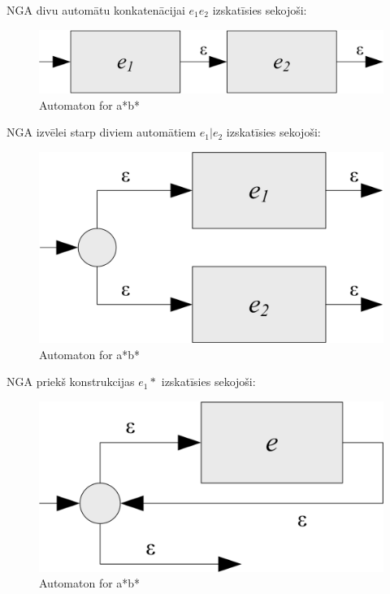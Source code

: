 NGA divu automātu konkatenācijai $e_1 e_2$  izskatīsies sekojoši:
\begin{figure}[h]
  \centering
    \includegraphics[scale=1.5]{pictures/auto_sequence_1}
  \caption{Automaton for a*b*}
  \label{fig:automaton_aastbast}
\end{figure}

NGA izvēlei starp diviem automātiem $e_1 | e_2$ izskatīsies sekojoši:
\begin{figure}[h]
  \centering
    \includegraphics[scale=1.5]{pictures/auto_or_1}
  \caption{Automaton for a*b*}
  \label{fig:automaton_aastbast}
\end{figure}

NGA priekš konstrukcijas $e_1 *$ izskatīsies sekojoši:
\begin{figure}[h]
  \centering
    \includegraphics[scale=1.5]{pictures/auto_asterisk_1}
  \caption{Automaton for a*b*}
  \label{fig:automaton_aastbast}
\end{figure}

